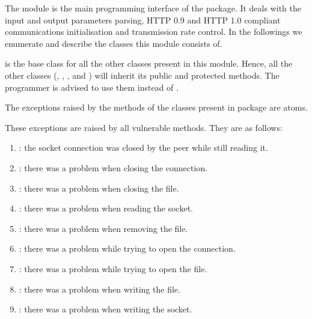 \documentclass{ozdoc}
\begin{document}
\label{CHAPTER.HTTPCLIENT}



The  module is the main programming interface of the  package. It deals with the input and output parameters parsing, HTTP 0.9 and HTTP 1.0 compliant communications initialisation and transmission rate control. In the followings we enumerate and describe the classes this module consists of. 

 is the base class for all the other classes present in this module. Hence, all the other classes (, , ,  and ) will inherit its public and protected methods. The programmer is advised to use them instead of .  

\label{SECTION.EXCEPTIONS}



The exceptions raised by the methods of the classes present in  package are atoms.     

\label{SUBSECTION.GENEXCEPTIONS}



  \mozartEMPTY
These exceptions are raised by all vulnerable methods. They are as follows: \mozartEMPTY
\begin{enumerate}
\item{} : the socket connection was closed by the peer while still reading it. 
\item{} : there was a problem when closing the connection.
\item{} : there was a problem when closing the file.
\item{} : there was a problem when reading the socket.
\item{} : there was a problem when removing the file.
\item{} : there was a problem while trying to open the connection.
\item{} : there was a problem while trying to open the file.
\item{} : there was a problem when writing the file.
\item{} : there was a problem when writing the socket.
\end{enumerate}
\end{document}
